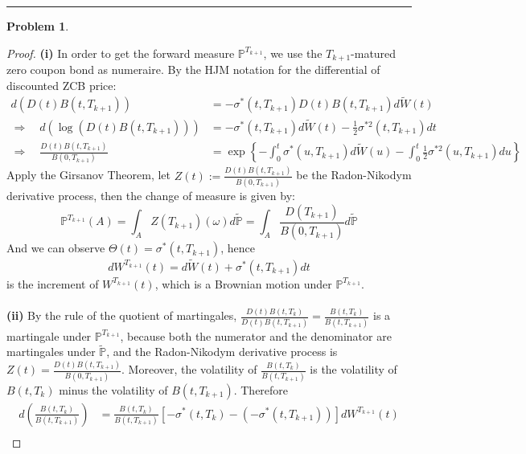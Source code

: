 \documentclass[a4paper, 10pt]{article}
\theoremstyle{definition}
\newtheorem{problem}{Problem}
\theoremstyle{hSol}
\begin{document}
\noindent\rule{16cm}{0.4pt}
\begin{problem} 
\end{problem}
\begin{proof} \textbf{(i)} In order to get the forward measure $\mathbb{P}^{T_{k+1}}$, we use the $T_{k+1}$-matured zero coupon bond as numeraire. By the HJM notation for the differential of discounted ZCB price:
\begin{equation}
  \begin{split}
    d(D(t)B(t,T_{k+1})) &= -\sigma^*(t,T_{k+1})D(t)B(t,T_{k+1})d\widetilde{W}(t) \\
    \Rightarrow \quad d(\log(D(t)B(t,T_{k+1}))) &= -\sigma^*(t,T_{k+1})d\widetilde{W}(t)-\frac{1}{2}\sigma^{*2}(t,T_{k+1})dt\\
    \Rightarrow \quad \frac{D(t)B(t,T_{k+1})}{B(0,T_{k+1})} &= \exp\left\{-\int_0^t\sigma^*(u,T_{k+1})d\widetilde{W}(u)-\int_0^t\frac{1}{2}\sigma^{*2}(u,T_{k+1})du\right\}
  \end{split}
\end{equation}
Apply the Girsanov Theorem, let $Z(t):= \frac{D(t)B(t,T_{k+1})}{B(0,T_{k+1})}$ be the Radon-Nikodym derivative process, then the change of measure is given by:
\begin{equation}
  \mathbb{P}^{T_{k+1}}(A) = \int_A Z(T_{k+1})(\omega)d \widetilde{\mathbb{P}} = \int_A \frac{D(T_{k+1})}{B(0,T_{k+1})}d \widetilde{\mathbb{P}}
\end{equation}
And we can observe $\Theta(t) = \sigma^*(t,T_{k+1})$, hence
\begin{equation}
  dW^{T_{k+1}}(t) =  d\widetilde{W}(t) + \sigma^*(t,T_{k+1}) dt
\end{equation}
is the increment of $W^{T_{k+1}}(t)$, which is a Brownian motion under $\mathbb{P}^{T_{k+1}}$. \\
~\\
\textbf{(ii)} By the rule of the quotient of martingales, $\frac{D(t)B(t,T_k)}{D(t)B(t,T_{k+1})} = \frac{B(t,T_k)}{B(t,T_{k+1})}$ is a martingale under $\mathbb{P}^{T_{k+1}}$, because both the numerator and the denominator are martingales under $\widetilde{\mathbb{P}}$, and the Radon-Nikodym derivative process is $Z(t)=\frac{D(t)B(t,T_{k+1})}{B(0,T_{k+1})}$. Moreover, the volatility of $\frac{B(t,T_k)}{B(t,T_{k+1})}$ is the volatility of $B(t,T_k)$ minus the volatility of $B(t,T_{k+1})$. Therefore
\begin{equation}
  \begin{split}
    d\left(\frac{B(t,T_k)}{B(t,T_{k+1})}\right) &= \frac{B(t,T_k)}{B(t,T_{k+1})}\left[-\sigma^*(t,T_{k})-(-\sigma^*(t,T_{k+1}))\right] dW^{T_{k+1}}(t)\\

\end{split}
\end{equation}
\end{proof}
\end{document}
